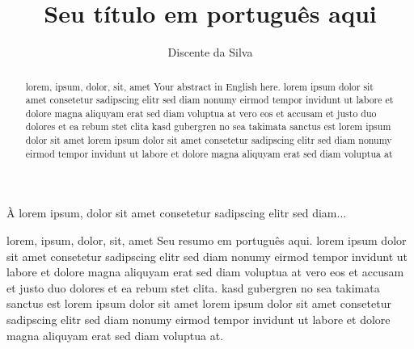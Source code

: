 \documentclass[english,oneside]{pucrs-ppgcc}
\author{Discente da Silva}
\title{Seu título em português aqui}
      {Your title in english here}
\begin{document}



\begin{agradecimentos}
À lorem ipsum, dolor sit amet consetetur sadipscing elitr sed diam...
\end{agradecimentos}

\begin{resumo}{lorem, ipsum, dolor, sit, amet}
Seu resumo em português aqui. lorem ipsum dolor sit amet
consetetur sadipscing elitr sed diam nonumy eirmod tempor invidunt
ut labore et dolore magna aliquyam erat sed diam voluptua at vero
eos et accusam et justo duo dolores et ea rebum stet clita.  kasd
gubergren no sea takimata sanctus est lorem ipsum dolor sit amet
lorem ipsum dolor sit amet consetetur sadipscing elitr sed diam
nonumy eirmod tempor invidunt ut labore et dolore magna aliquyam
erat sed diam voluptua at.
\end{resumo}

\begin{abstract}{lorem, ipsum, dolor, sit, amet}
Your abstract in English here. lorem ipsum dolor sit amet
consetetur sadipscing elitr sed diam nonumy eirmod tempor invidunt
ut labore et dolore magna aliquyam erat sed diam voluptua at vero
eos et accusam et justo duo dolores et ea rebum stet clita kasd
gubergren no sea takimata sanctus est lorem ipsum dolor sit amet
lorem ipsum dolor sit amet consetetur sadipscing elitr sed diam
nonumy eirmod tempor invidunt ut labore et dolore magna aliquyam
erat sed diam voluptua at
\end{abstract}
\end{document}

